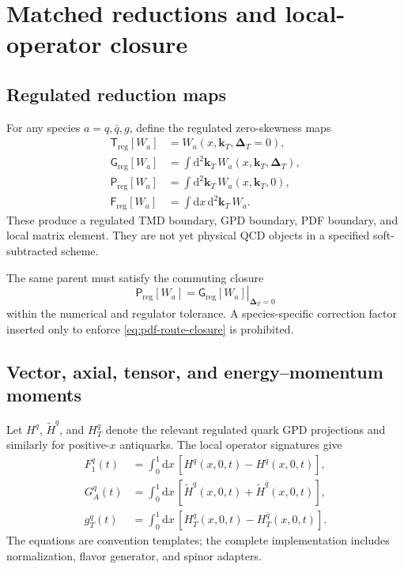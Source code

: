 \documentclass[11pt]{article}
\newcommand{\kT}{\bm{k}_{T}}
\newcommand{\DT}{\bm{\Delta}_{T}}
\newcommand{\dd}{\mathrm{d}}
\newcommand{\reg}{\mathrm{reg}}
\begin{document}
\section{Matched reductions and local-operator closure}
\label{sec:reductions}

\subsection{Regulated reduction maps}

For any species \(a=q,\bar q,g\), define the regulated zero-skewness maps
\begin{align}
 \mathsf T_{\reg}[W_a]
 &=W_a(x,\kT,\DT=0),
 \\
 \mathsf G_{\reg}[W_a]
 &=\int\dd^2\kT\,W_a(x,\kT,\DT),
 \\
 \mathsf P_{\reg}[W_a]
 &=\int\dd^2\kT\,W_a(x,\kT,0),
 \\
 \mathsf F_{\reg}[W_a]
 &=\int\dd x\,\dd^2\kT\,W_a.
 \label{eq:regulated-reductions}
\end{align}
These produce a regulated TMD boundary, GPD boundary, PDF boundary, and local
matrix element.  They are not yet physical QCD objects in a specified
soft-subtracted scheme.

The same parent must satisfy the commuting closure
\begin{equation}
 \mathsf P_{\reg}[W_a]
 =
 \left.\mathsf G_{\reg}[W_a]\right|_{\DT=0}
 \label{eq:pdf-route-closure}
\end{equation}
within the numerical and regulator tolerance.  A species-specific correction
factor inserted only to enforce \cref{eq:pdf-route-closure} is prohibited.

\subsection{Vector, axial, tensor, and energy--momentum moments}

Let \(H^q\), \(\widetilde H^q\), and \(H_T^q\) denote the relevant regulated
quark GPD projections and similarly for positive-\(x\) antiquarks.  The local
operator signatures give
\begin{align}
 F_1^q(t)
 &=\int_0^1\dd x\,
 \left[
 H^q(x,0,t)-H^{\bar q}(x,0,t)
 \right],
 \label{eq:vector-moment}
 \\
 G_A^q(t)
 &=\int_0^1\dd x\,
 \left[
 \widetilde H^q(x,0,t)+\widetilde H^{\bar q}(x,0,t)
 \right],
 \label{eq:axial-moment}
 \\
 g_T^q(t)
 &=\int_0^1\dd x\,
 \left[
 H_T^q(x,0,t)-H_T^{\bar q}(x,0,t)
 \right].
 \label{eq:tensor-moment}
\end{align}
The equations are convention templates; the complete implementation includes
normalization, flavor generator, and spinor adapters.
\end{document}
